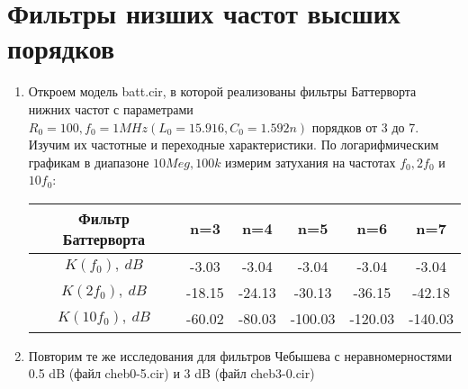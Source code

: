 \documentclass[a4paper, 12pt]{article}%
\begin{document}
\section{Фильтры низших частот высших порядков}

\begin{enumerate}

\item Откроем модель batt.cir, в которой реализованы фильтры Баттерворта нижних частот с параметрами $R_0 = 100, f_0 = 1MHz (L_0= 15.916, C_0 = 1.592n)$ порядков от 3 до 7. Изучим их частотные и переходные характеристики. По логарифмическим графикам в диапазоне $10Meg, 100k$ измерим затухания на частотах $f_0, 2f_0$ и $10f_0$:

\begin{center}
\begin{tabular}{|c|c|c|c|c|c|}
\hline 
Фильтр Баттерворта & n=3 & n=4 & n=5 & n=6 & n=7 \\ 
\hline 
$K(f_0), \: dB$ & -3.03 & -3.04 & -3.04 & -3.04 & -3.04 \\ 
\hline 
$K(2f_0), \: dB$ & -18.15 & -24.13 & -30.13 & -36.15 & -42.18 \\ 
\hline 
$K(10f_0), \: dB$ & -60.02 & -80.03 & -100.03 & -120.03 & -140.03 \\ 
\hline 
\end{tabular} 
\end{center}

\item Повторим те же исследования для фильтров Чебышева с неравномерностями 0.5 dB (файл cheb0-5.cir) и 3 dB (файл cheb3-0.cir)

\end{enumerate}
\end{document}
